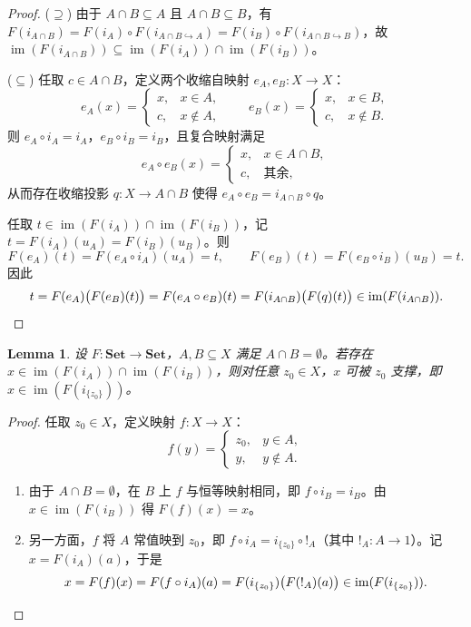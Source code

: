 \documentclass[11pt,a4paper]{ctexart}
\theoremstyle{plain}
\newtheorem{lemma}{Lemma}[section]
\newcommand{\im}{\operatorname{im}}
\newcommand{\Set}{\mathbf{Set}}
\begin{document}
\begin{proof}
($\supseteq$) 由于 $A \cap B \subseteq A$ 且 $A \cap B \subseteq B$，有 $F(i_{A \cap B}) = F(i_A) \circ F(i_{A\cap B \hookrightarrow A}) = F(i_B) \circ F(i_{A\cap B \hookrightarrow B})$，故 $\im(F(i_{A \cap B})) \subseteq \im(F(i_A)) \cap \im(F(i_B))$。

($\subseteq$) 任取 $c \in A \cap B$，定义两个收缩自映射 $e_A, e_B : X \to X$：
\[
  e_A(x) = \begin{cases} x, & x \in A, \\ c, & x \notin A, \end{cases}
  \qquad
  e_B(x) = \begin{cases} x, & x \in B, \\ c, & x \notin B. \end{cases}
\]
则 $e_A \circ i_A = i_A$，$e_B \circ i_B = i_B$，且复合映射满足
\[
  e_A \circ e_B(x) = \begin{cases} x, & x \in A \cap B, \\ c, & \text{其余}, \end{cases}
\]
从而存在收缩投影 $q : X \to A \cap B$ 使得 $e_A \circ e_B = i_{A \cap B} \circ q$。

任取 $t \in \im(F(i_A)) \cap \im(F(i_B))$，记 $t = F(i_A)(u_A) = F(i_B)(u_B)$。则
\[
  F(e_A)(t) = F(e_A \circ i_A)(u_A) = t, \qquad F(e_B)(t) = F(e_B \circ i_B)(u_B) = t.
\]
因此
\[
  t = F(e_A)\bigl(F(e_B)(t)\bigr) = F(e_A \circ e_B)(t) = F(i_{A \cap B})\bigl(F(q)(t)\bigr) \in \im(F(i_{A \cap B})). \qedhere
\]
\end{proof}

\begin{lemma}
设 $F : \Set \to \Set$，$A, B \subseteq X$ 满足 $A \cap B = \emptyset$。若存在 $x \in \im(F(i_A)) \cap \im(F(i_B))$，则对任意 $z_0 \in X$，$x$ 可被 $z_0$ 支撑，即 $x \in \im(F(i_{\{z_0\}}))$。
\end{lemma}

\begin{proof}
任取 $z_0 \in X$，定义映射 $f : X \to X$：
\[
  f(y) = \begin{cases} z_0, & y \in A, \\ y, & y \notin A. \end{cases}
\]
\begin{enumerate}[label=(\arabic*)]
  \item 由于 $A \cap B = \emptyset$，在 $B$ 上 $f$ 与恒等映射相同，即 $f \circ i_B = i_B$。由 $x \in \im(F(i_B))$ 得 $F(f)(x) = x$。
  \item 另一方面，$f$ 将 $A$ 常值映到 $z_0$，即 $f \circ i_A = i_{\{z_0\}} \circ {!}_A$（其中 ${!}_A : A \to 1$）。记 $x = F(i_A)(a)$，于是
    \[
      x = F(f)(x) = F(f \circ i_A)(a) = F(i_{\{z_0\}})\bigl(F({!}_A)(a)\bigr) \in \im(F(i_{\{z_0\}})). \qedhere
    \]
\end{enumerate}
\end{proof}
\end{document}
